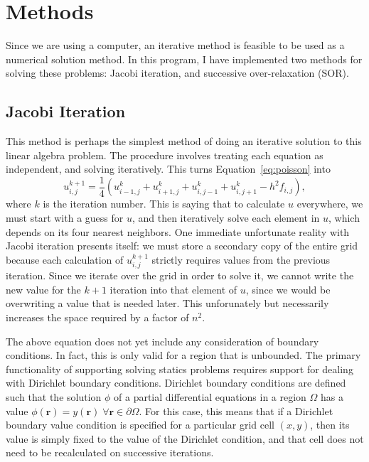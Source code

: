 \section{Methods}

Since we are using a computer, an iterative method is feasible to be used as a numerical solution method. In this
program, I have implemented two methods for solving these problems: Jacobi iteration, and successive over-relaxation (SOR).

\subsection{Jacobi Iteration}
This method is perhaps the simplest method of doing an iterative solution to this linear algebra problem. The procedure
involves treating each equation as independent, and solving iteratively. This turns Equation~\ref{eq:poisson} into\cite{poisson-relax}
\begin{equation} \label{eq:jacobi}
u_{i,j}^{k+1} = \frac{1}{4}(u_{i-1,j}^{k} + u_{i+1,j}^{k} + u_{i,j-1}^{k} + u_{i,j+1}^{k} - h^2f_{i,j}),
\end{equation}
where $k$ is the iteration number. This is saying that to calculate $u$ everywhere, we must start with a guess for $u$,
and then iteratively solve each element in $u$, which depends on its four nearest neighbors. One immediate unfortunate
reality with Jacobi iteration presents itself: we must store a secondary copy of the entire grid because each calculation
of $u_{i,j}^{k+1}$ strictly requires values from the previous iteration. Since we iterate over the grid in order to solve
it, we cannot write the new value for the $k+1$ iteration into that element of $u$, since we would be overwriting a value
that is needed later. This unforunately but necessarily increases the space required by a factor of $n^2$.


The above equation does not yet include any consideration of boundary conditions. In fact, this is only valid for a region
that is unbounded. The primary functionality of supporting solving statics problems requires support for dealing with
Dirichlet boundary conditions. Dirichlet boundary conditions are defined such that the solution $\phi$ of a partial
differential equations in a region $\Omega$ has a value $\phi(\mathbf{r}) = y(\mathbf{r}) \; \forall \mathbf{r} \in \partial \Omega$.
For this case, this means that if a Dirichlet boundary value condition is specified for a particular grid cell $(x,y)$,
then its value is simply fixed to the value of the Dirichlet condition, and that cell does not need to be recalculated on
successive iterations.

